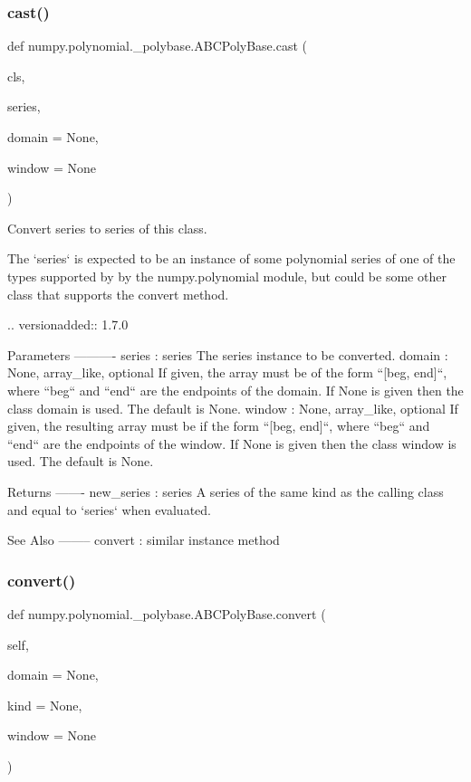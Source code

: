 \subsubsection{\texorpdfstring{cast()}{cast()}}
{\footnotesize\ttfamily def numpy.\+polynomial.\+\_\+polybase.\+A\+B\+C\+Poly\+Base.\+cast (\begin{DoxyParamCaption}\item[{}]{cls,  }\item[{}]{series,  }\item[{}]{domain = {\ttfamily None},  }\item[{}]{window = {\ttfamily None} }\end{DoxyParamCaption})}

\begin{DoxyVerb}Convert series to series of this class.

The `series` is expected to be an instance of some polynomial
series of one of the types supported by by the numpy.polynomial
module, but could be some other class that supports the convert
method.

.. versionadded:: 1.7.0

Parameters
----------
series : series
    The series instance to be converted.
domain : {None, array_like}, optional
    If given, the array must be of the form ``[beg, end]``, where
    ``beg`` and ``end`` are the endpoints of the domain. If None is
    given then the class domain is used. The default is None.
window : {None, array_like}, optional
    If given, the resulting array must be if the form
    ``[beg, end]``, where ``beg`` and ``end`` are the endpoints of
    the window. If None is given then the class window is used. The
    default is None.

Returns
-------
new_series : series
    A series of the same kind as the calling class and equal to
    `series` when evaluated.

See Also
--------
convert : similar instance method\end{DoxyVerb}
 \mbox{\label{classnumpy_1_1polynomial_1_1__polybase_1_1ABCPolyBase_a8cc2deb5528f46aefdef6eae1bb0c0a6}} 
\subsubsection{\texorpdfstring{convert()}{convert()}}
{\footnotesize\ttfamily def numpy.\+polynomial.\+\_\+polybase.\+A\+B\+C\+Poly\+Base.\+convert (\begin{DoxyParamCaption}\item[{}]{self,  }\item[{}]{domain = {\ttfamily None},  }\item[{}]{kind = {\ttfamily None},  }\item[{}]{window = {\ttfamily None} }\end{DoxyParamCaption})}

